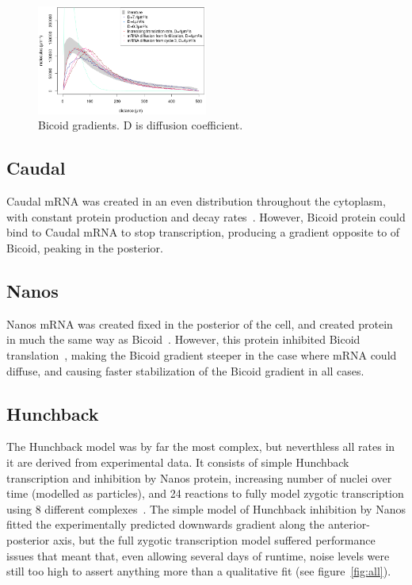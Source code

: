 \documentclass[11pt,a4paper,twocolumn]{article}
\begin{document}
\begin{figure}[h!]
  \centering
    \includegraphics[width=0.5\textwidth]{writeup-bcd-diffusion}
  \caption{Bicoid gradients. D is diffusion coefficient. \label{fig:bcd-grads}}
\end{figure}

\subsection{Caudal}
Caudal mRNA was created in an even distribution throughout the cytoplasm, with constant protein production and decay rates~\cite{Bergmann2007}. However, Bicoid protein could bind to Caudal mRNA to stop transcription, producing a gradient opposite to of Bicoid, peaking in the posterior.

\subsection{Nanos}
Nanos mRNA was created fixed in the posterior of the cell, and created protein in much the same way as Bicoid~\cite{Kugler2009,Bergmann2007}. However, this protein inhibited Bicoid translation~\cite{Little2011}, making the Bicoid gradient steeper in the case where mRNA could diffuse, and causing faster stabilization of the Bicoid gradient in all cases.

\subsection{Hunchback}
The Hunchback model was by far the most complex, but neverthless all rates in it are derived from experimental data. It consists of simple Hunchback transcription and inhibition by Nanos protein, increasing number of nuclei over time (modelled as particles), and 24 reactions to fully model zygotic transcription using 8 different complexes~\cite{Holloway2011}. The simple model of Hunchback inhibition by Nanos fitted the experimentally predicted downwards gradient along the anterior-posterior axis, but the full zygotic transcription model suffered performance issues that meant that, even allowing several days of runtime, noise levels were still too high to assert anything more than a qualitative fit (see figure~\ref{fig:all}).
\end{document}
